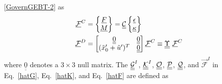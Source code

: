 \eqref{GovernGEBT-2} as
\begin{align}
	\label{FC}
	\mathcal{\underline{F}}^C &= \begin{Bmatrix}
         \underline{F} \\
	\underline{M}
	\end{Bmatrix} = \underline{\underline{\mathcal{C}}} \begin{Bmatrix}
	\underline{\epsilon} \\
	\underline{\kappa}
	\end{Bmatrix} \\
	\label{FD}
	\mathcal{\underline{F}}^D & = \begin{bmatrix}
	\underline{\underline{0}} & \underline{\underline{0}}\\
	(\tilde{x}_0^\prime+\tilde{u}^\prime)^T & \underline{\underline{0}}
	\end{bmatrix}
	\mathcal{\underline{F}}^C \equiv \underline{\underline{\Upsilon}}~ \mathcal{\underline{F}}^C
\end{align}
where $\underline{\underline{0}}$ denotes a $3 \times 3$ null matrix. 
The $\underline{\underline{\mathcal{G}}}^I$, $\underline{\underline{\mathcal{K}}}^I$,  $\mathcal{\underline{\underline{O}}}$, $\mathcal{\underline{\underline{P}}}$, $\mathcal{\underline{\underline{Q}}}$, and $\vec{\mathcal{F}}^I$ in Eq.~\eqref{hatG}, Eq.~\eqref{hatK}, and Eq.~\eqref{hatF} are defined as
